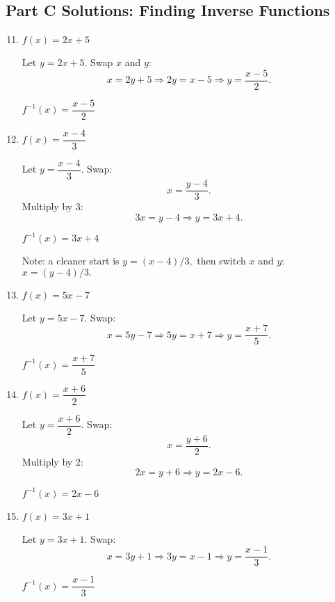 \documentclass[12pt]{article}
\begin{document}
\subsection*{Part C Solutions: Finding Inverse Functions}
\begin{enumerate}
  \setcounter{enumi}{10}
  \item \(f(x) = 2x + 5\)

  Let \(y = 2x + 5.\) Swap \(x\) and \(y\):
  \[
  x = 2y + 5 \Rightarrow 2y = x - 5 \Rightarrow y = \frac{x - 5}{2}.
  \]

  \(\boxed{f^{-1}(x) = \dfrac{x - 5}{2}}\)

  \item \(f(x) = \dfrac{x - 4}{3}\)

  Let \(y = \dfrac{x - 4}{3}.\) Swap:
  \[
  x = \dfrac{y - 4}{3}.
  \]
  Multiply by 3:
  \[
  3x = y - 4 \Rightarrow y = 3x + 4.
  \]

  \(\boxed{f^{-1}(x) = 3x + 4}\)

  Note: a cleaner start is \(y = (x - 4)/3,\) then switch \(x\) and \(y\): \(x = (y - 4)/3.\)

  \item \(f(x) = 5x - 7\)

  Let \(y = 5x - 7.\) Swap:
  \[
  x = 5y - 7 \Rightarrow 5y = x + 7 \Rightarrow y = \frac{x + 7}{5}.
  \]

  \(\boxed{f^{-1}(x) = \dfrac{x + 7}{5}}\)

  \item \(f(x) = \dfrac{x + 6}{2}\)

  Let \(y = \dfrac{x + 6}{2}.\) Swap:
  \[
  x = \dfrac{y + 6}{2}.
  \]
  Multiply by 2:
  \[
  2x = y + 6 \Rightarrow y = 2x - 6.
  \]

  \(\boxed{f^{-1}(x) = 2x - 6}\)

  \item \(f(x) = 3x + 1\)

  Let \(y = 3x + 1.\) Swap:
  \[
  x = 3y + 1 \Rightarrow 3y = x - 1 \Rightarrow y = \frac{x - 1}{3}.
  \]

  \(\boxed{f^{-1}(x) = \dfrac{x - 1}{3}}\)
\end{enumerate}
\end{document}
